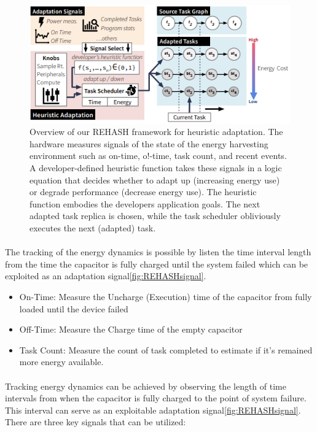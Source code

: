     \begin{figure}[htbp]
        \centering
        \includegraphics[width=1\textwidth]{img/chap2/Figure - REHASH.png}
        \caption{Overview of our REHASH framework for heuristic adaptation. The hardware measures signals of the state of the energy harvesting environment such as on-time, o!-time, task count, and recent events. A developer-defined heuristic function takes these signals in a logic equation that decides whether to adapt up (increasing energy use) or degrade performance (decrease energy use). The heuristic function embodies the developers application goals. The next adapted task replica is chosen, while the task scheduler obliviously executes the next (adapted) task.\cite{10.1145/3478077}}
        \label{fig:REHASH}
    \end{figure}

    \paragraph{}
    The tracking of the energy dynamics is possible by listen the time interval length from the time the capacitor is fully charged until the system failed which can be exploited as an adaptation signal\ref{fig:REHASHsignal}.
    \begin{itemize}
        \item On-Time: Measure the Uncharge (Execution) time of the capacitor from fully loaded until the device failed
        \item Off-Time: Measure the Charge time of the empty capacitor
        \item Task Count: Measure the count of task completed to estimate if it's remained more energy available.
    \end{itemize}

    \paragraph{}
        Tracking energy dynamics can be achieved by observing the length of time intervals from when the capacitor is fully charged to the point of system failure. This interval can serve as an exploitable adaptation signal\ref{fig:REHASHsignal}. There are three key signals that can be utilized:
        
